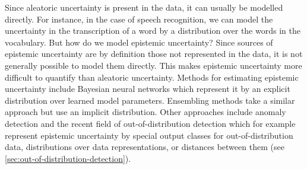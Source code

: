 Since aleatoric uncertainty is present in the data, it can usually be modelled directly. For instance, in the case of speech recognition, we can model the uncertainty in the transcription of a word by a distribution over the words in the vocabulary. But how do we model epistemic uncertainty? 
Since sources of epistemic uncertainty are by definition those not represented in the data, it is not generally possible to model them directly. This makes epistemic uncertainty more difficult to quantify than aleatoric uncertainty. 
Methods for estimating epistemic uncertainty include Bayesian neural networks \cite{mackay_practical_1992, neal_bayesian_1995} which represent it by an explicit distribution over learned model parameters. Ensembling methods \cite{gal_dropout_2016,lakshminarayanan_simple_2017} take a similar approach but use an implicit distribution. 
Other approaches include anomaly detection and the recent field of out-of-distribution detection which for example represent epistemic uncertainty by special output classes for out-of-distribution data, distributions over data representations, or distances between them (see \cref{sec:out-of-distribution-detection}). 



